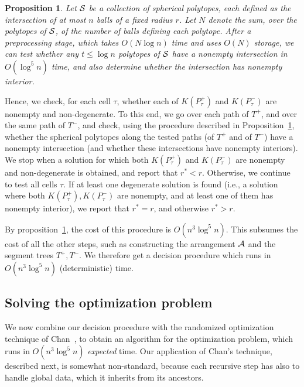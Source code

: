 \documentclass[a4paper,12pt]{article}
\def\A{{\cal A}}
\def\S{{\cal S}}
\newtheorem{proposition}[theorem]{Proposition}
\begin{document}
\begin{proposition}
\label{prop:intersection_test} Let $\S$ be a collection of spherical
polytopes, each defined as the intersection of at most $n$ balls of
a fixed radius $r$. Let $N$ denote the sum, over the polytopes of
$\S$, of the number of balls defining each polytope. After a
preprocessing stage, which takes $O(N \log n)$ time and uses $O(N)$
storage, we can test whether any $t \leq \log n$ polytopes of $\S$
have a nonempty intersection in $O(\log^5 n)$ time, and also
determine whether the intersection has nonempty interior.
\end{proposition}

Hence, we check, for each cell $\tau$, whether each of $K(P_\tau^+)$
and $K(P_\tau^-)$ are nonempty and non-degenerate. To this end, we
go over each path of $T^+$, and over the same path of $T^-$, and
check, using the procedure described in
Proposition~\ref{prop:intersection_test}, whether the spherical
polytopes along the tested paths (of $T^+$ and of $T^-$) have a
nonempty intersection (and whether these intersections have nonempty
interiors). We stop when a solution for which both $K(P_\tau^+)$ and
$K(P_\tau^-)$ are nonempty and non-degenerate is obtained, and
report that $r^* < r$. Otherwise, we continue to test all cells
$\tau$. If at least one degenerate solution is found (i.e., a
solution where both $K(P_\tau^+), K(P_\tau^-)$ are nonempty, and at
least one of them has nonempty interior), we report that $r^* = r$,
and otherwise $r^* > r$.

By proposition~\ref{prop:intersection_test}, the cost of this
procedure is $O(n^3 \log^5 n)$. This subsumes the cost of all the
other steps, such as constructing the arrangement $\A$ and the
segment trees $T^+, T^-$. We therefore get a decision procedure
which runs in $O(n^3 \log^5 n)$ (deterministic) time.

\subsection{Solving the optimization problem}
\label{subsec:optimization_problem}
We now combine our decision procedure with the randomized
optimization technique of Chan~\cite{TCG}, to obtain an algorithm
for the optimization problem, which runs in $O(n^3 \log^5 n)$
\emph{expected} time. Our application of Chan's technique, described
next, is somewhat non-standard, because each recursive step has also
to handle global data, which it inherits from its ancestors.
\end{document}
